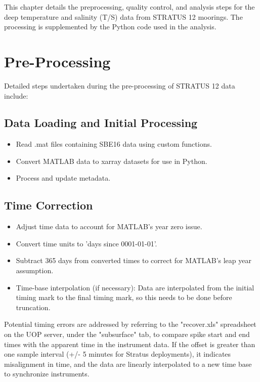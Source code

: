 \documentclass[11pt]{article}
\newcommand{\projectname}{STRATUS}  %
\newcommand{\casenumber}{12}  %
\newcommand{\FirstInstrumentType}{SBE16}  %
\begin{document}
This chapter details the preprocessing, quality control, 
and analysis steps for the deep temperature and salinity (T/S) data from \projectname{} \casenumber{} moorings.
The processing is supplemented by the Python code used in the analysis.

\section{Pre-Processing}
Detailed steps undertaken during the pre-processing of \projectname{} \casenumber{} data include:

\subsection{Data Loading and Initial Processing}
\begin{itemize}
\item Read .mat files containing \FirstInstrumentType{} data using custom functions.
\item Convert MATLAB data to xarray datasets for use in Python.
\item Process and update metadata.
\end{itemize}

\subsection{Time Correction}
\begin{itemize}
\item Adjust time data to account for MATLAB's year zero issue.
\item Convert time units to 'days since 0001-01-01'.
\item Subtract 365 days from converted times to correct for MATLAB's leap year assumption.
\item Time-base interpolation (if necessary): Data are interpolated from the initial timing mark to the final timing mark, 
so this needs to be done before truncation.
\end{itemize}

Potential timing errors are addressed by referring to the "recover.xls" spreadsheet on the UOP server, 
under the "subsurface" tab, to compare spike start and end times with the apparent time in the instrument data. 
If the offset is greater than one sample interval (+/- 5 minutes for Stratus deployments), 
it indicates misalignment in time, and the data are linearly interpolated to a new time base to synchronize instruments.
\end{document}
